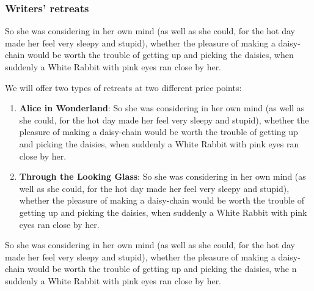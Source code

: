 \documentclass[12pt]{article}
\begin{document}
\subsubsection{Writers' retreats}
\label{sec-5-3-1}
So she was considering in her own mind (as well as she could, for the hot day made her feel very sleepy and stupid), whether the pleasure of making a daisy-chain would be worth the trouble of getting up and picking the daisies, when suddenly a White Rabbit with pink eyes ran close by her. 

We will offer two types of retreats at two different price points: 
\begin{enumerate}
\item \textbf{Alice in Wonderland}: So she was considering in her own mind (as well as she could, for the hot day made her feel very sleepy and stupid), whether the pleasure of making a daisy-chain would be worth the trouble of getting up and picking the daisies, when suddenly a White Rabbit with pink eyes ran close by her.
\item \textbf{Through the Looking Glass}: So she was considering in her own mind (as well as she could, for the hot day made her feel very sleepy and stupid), whether the pleasure of making a daisy-chain would be worth the trouble of getting up and picking the daisies, when suddenly a White Rabbit with pink eyes ran close by her.
\end{enumerate}

So she was considering in her own mind (as well as she could, for the hot day made her feel very sleepy and stupid), whether the pleasure of making a daisy-chain would be worth the trouble of getting up and picking the daisies, whe n suddenly a White Rabbit with pink eyes ran close by her. 
\end{document}
